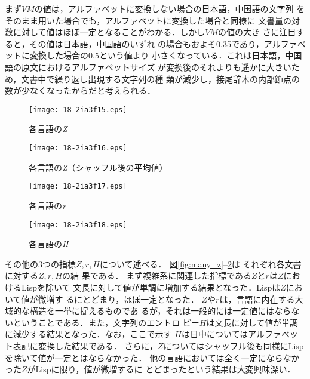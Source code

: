\documentclass[japanese]{jnlp_JS2.0}
\begin{document}
まず$\mathit{VM}$の値は，アルファベットに変換しない場合の日本語，中国語の文字列
をそのまま用いた場合でも，アルファベットに変換した場合と同様に
文書量の対数に対して値はほぼ一定となることがわかる．しかし$\mathit{VM}$の値の大き
さに注目すると，その値は日本語，中国語のいずれ
の場合もおよそ0.35であり，アルファベットに変換した場合の0.5という値より
小さくなっている．これは日本語，中国語の原文におけるアルファベットサイズ
が変換後のそれよりも遥かに大きいため，文書中で繰り返し出現する文字列の種
類が減少し，接尾辞木の内部節点の数が少なくなったからだと考えられる．

\begin{figure}[b]
\noindent
 \begin{minipage}{0.5\textwidth}
  \begin{center}
   \texttt{[image: 18-2ia3f15.eps]}
  \end{center}
  \caption{各言語の{\it Z}}
  \label{fig:many_z}
 \end{minipage}
  \begin{minipage}{0.5\textwidth}
  \begin{center}
   \texttt{[image: 18-2ia3f16.eps]}
  \end{center}
  \caption{各言語の{\it Z}（シャッフル後の平均値）}
 \label{fig:many_sh_z}
 \end{minipage}
\end{figure}
\begin{figure}[b]
\noindent
 \begin{minipage}{0.5\textwidth}
  \begin{center}
   \texttt{[image: 18-2ia3f17.eps]}
  \end{center}
  \caption{各言語の{\it r}}
  \label{fig:many_r}
 \end{minipage}
 \begin{minipage}{0.5\textwidth}
  \begin{center}
   \texttt{[image: 18-2ia3f18.eps]}
  \end{center}
  \caption{各言語の{\it H}}
  \label{fig:many_h}
 \end{minipage}
\end{figure}

その他の3つの指標$Z, r, H$について述べる．
    図\ref{fig:many_z}--\ref{fig:many_h}は
それぞれ各文書に対する$Z, r, H$の結
果である．
まず複雑系に関連した指標である$Zとr$は$Z$におけるLispを除いて
文長に対して値が単調に増加する結果となった．Lispは$Z$において値が微増す
るにとどまり，ほぼ一定となった．
$Z$や$r$は，言語に内在する大域的な構造を一挙に捉えるものであ
るが，それは一般的には一定値にはならないということである．また，文字列のエントロ
ピー$H$は文長に対して値が単調に減少する結果となった．なお，ここで示す
$H$は日中についてはアルファベット表記に変換した結果である．
さらに，$Z$についてはシャッフル後も同様にLispを除いて値が一定とはならなかった．
他の言語においては全く一定にならなかった$Z$がLispに限り，値が微増するに
とどまったという結果は大変興味深い．
\end{document}
